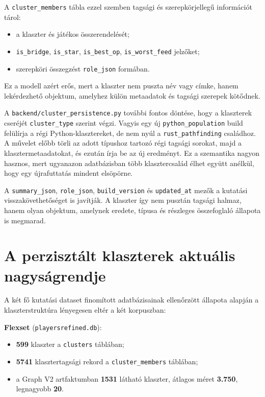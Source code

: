 ﻿\documentclass[a4paper,12pt]{report}
\begin{document}
A \texttt{cluster\_members} tábla ezzel szemben tagsági és szerepkörjellegű információt tárol:

\begin{itemize}
    \item a klaszter és játékos összerendelését;
    \item \texttt{is\_bridge}, \texttt{is\_star}, \texttt{is\_best\_op}, \texttt{is\_worst\_feed} jelzőket;
    \item szerepköri összegzést \texttt{role\_json} formában.
\end{itemize}

Ez a modell azért erős, mert a klaszter nem puszta név vagy címke, hanem lekérdezhető objektum, amelyhez külön metaadatok és tagsági szerepek kötődnek.

A \texttt{backend/cluster\_persistence.py} további fontos döntése, hogy a klaszterek cseréjét \texttt{cluster\_type} szerint végzi. Vagyis egy új \texttt{python\_population} build felülírja a régi Python-klasztereket, de nem nyúl a \texttt{rust\_pathfinding} családhoz. A művelet előbb törli az adott típushoz tartozó régi tagsági sorokat, majd a klasztermetaadatokat, és ezután írja be az új eredményt. Ez a szemantika nagyon hasznos, mert ugyanazon adatbázisban több klasztercsalád élhet együtt anélkül, hogy egy újrafuttatás mindent elsöpörne.

A \texttt{summary\_json}, \texttt{role\_json}, \texttt{build\_version} és \texttt{updated\_at} mezők a kutatási visszakövethetőséget is javítják. A klaszter így nem pusztán tagsági halmaz, hanem olyan objektum, amelynek eredete, típusa és részleges összefoglaló állapota is megmarad.

\section{A perzisztált klaszterek aktuális nagyságrendje}

A két fő kutatási dataset finomított adatbázisainak ellenőrzött állapota alapján a klaszterstruktúra lényegesen eltér a két korpuszban:

\textbf{Flexset} (\texttt{playersrefined.db}):
\begin{itemize}
    \item \textbf{599} klaszter a \texttt{clusters} táblában;
    \item \textbf{5741} klasztertagsági rekord a \texttt{cluster\_members} táblában;
    \item a Graph V2 artfaktumban \textbf{1531} látható klaszter, átlagos méret \textbf{3.750}, legnagyobb \textbf{20}.
\end{itemize}
\end{document}
